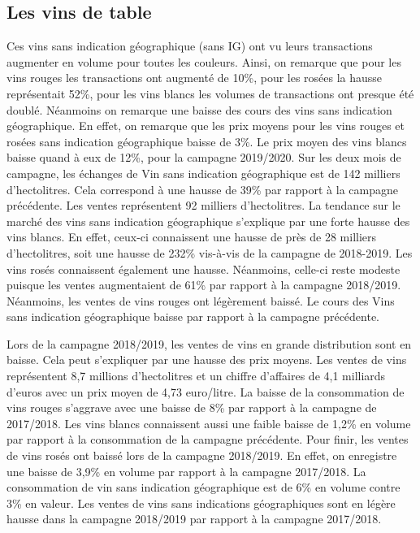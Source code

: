 \documentclass[11pt,]{article}
\begin{document}
\par

\FloatBarrier

\hypertarget{les-vins-de-table}{%
\subsection{Les vins de table}\label{les-vins-de-table}}

Ces vins sans indication géographique (sans IG) ont vu leurs
transactions augmenter en volume pour toutes les couleurs. Ainsi, on
remarque que pour les vins rouges les transactions ont augmenté de 10\%,
pour les rosées la hausse représentait 52\%, pour les vins blancs les
volumes de transactions ont presque été doublé. Néanmoins on remarque
une baisse des cours des vins sans indication géographique. En effet, on
remarque que les prix moyens pour les vins rouges et rosées sans
indication géographique baisse de 3\%. Le prix moyen des vins blancs
baisse quand à eux de 12\%, pour la campagne 2019/2020. Sur les deux
mois de campagne, les échanges de Vin sans indication géographique est
de 142 milliers d'hectolitres. Cela correspond à une hausse de 39\% par
rapport à la campagne précédente. Les ventes représentent 92 milliers
d'hectolitres. La tendance sur le marché des vins sans indication
géographique s'explique par une forte hausse des vins blancs. En effet,
ceux-ci connaissent une hausse de près de 28 milliers d'hectolitres,
soit une hausse de 232\% vis-à-vis de la campagne de 2018-2019. Les vins
rosés connaissent également une hausse. Néanmoins, celle-ci reste
modeste puisque les ventes augmentaient de 61\% par rapport à la
campagne 2018/2019. Néanmoins, les ventes de vins rouges ont légèrement
baissé. Le cours des Vins sans indication géographique baisse par
rapport à la campagne précédente.

\par

Lors de la campagne 2018/2019, les ventes de vins en grande distribution
sont en baisse. Cela peut s'expliquer par une hausse des prix moyens.
Les ventes de vins représentent 8,7 millions d'hectolitres et un chiffre
d'affaires de 4,1 milliards d'euros avec un prix moyen de 4,73
euro/litre. La baisse de la consommation de vins rouges s'aggrave avec
une baisse de 8\% par rapport à la campagne de 2017/2018. Les vins
blancs connaissent aussi une faible baisse de 1,2\% en volume par
rapport à la consommation de la campagne précédente. Pour finir, les
ventes de vins rosés ont baissé lors de la campagne 2018/2019. En effet,
on enregistre une baisse de 3,9\% en volume par rapport à la campagne
2017/2018. La consommation de vin sans indication géographique est de
6\% en volume contre 3\% en valeur. Les ventes de vins sans indications
géographiques sont en légère hausse dans la campagne 2018/2019 par
rapport à la campagne 2017/2018.
\end{document}
